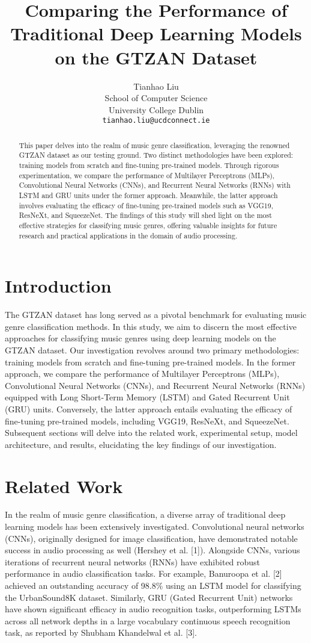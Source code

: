 \documentclass{article}
\title{Comparing the Performance of Traditional Deep Learning Models on the GTZAN Dataset}
\author{%
  Tianhao Liu \\
  School of Computer Science\\
  University College Dublin\\
  \texttt{tianhao.liu@ucdconnect.ie} \\
}
\begin{document}
\maketitle

\begin{abstract}
  This paper delves into the realm of music genre classification, leveraging the renowned GTZAN dataset as our testing ground. 
  Two distinct methodologies have been explored: training models from scratch and fine-tuning pre-trained models. 
  Through rigorous experimentation, we compare the performance of Multilayer Perceptrons (MLPs), Convolutional Neural Networks (CNNs), and Recurrent Neural Networks (RNNs) with LSTM and GRU units under the former approach. 
  Meanwhile, the latter approach involves evaluating the efficacy of fine-tuning pre-trained models such as VGG19, ResNeXt, and SqueezeNet. 
  The findings of this study will shed light on the most effective strategies for classifying music genres, offering valuable insights for future research and practical applications in the domain of audio processing.
\end{abstract}

\section{Introduction}
The GTZAN dataset has long served as a pivotal benchmark for evaluating music genre classification methods. 
In this study, we aim to discern the most effective approaches for classifying music genres using deep learning models on the GTZAN dataset. Our investigation revolves around two primary methodologies: training models from scratch and fine-tuning pre-trained models. 
In the former approach, we compare the performance of Multilayer Perceptrons (MLPs), Convolutional Neural Networks (CNNs), and Recurrent Neural Networks (RNNs) equipped with Long Short-Term Memory (LSTM) and Gated Recurrent Unit (GRU) units. 
Conversely, the latter approach entails evaluating the efficacy of fine-tuning pre-trained models, including VGG19, ResNeXt, and SqueezeNet.
Subsequent sections will delve into the related work, experimental setup, model architecture, and results, elucidating the key findings of our investigation.


\section{Related Work}
In the realm of music genre classification, a diverse array of traditional deep learning models has been extensively investigated. Convolutional neural networks (CNNs), originally designed for image classification, have demonstrated notable success in audio processing as well (Hershey et al. [1]). 
Alongside CNNs, various iterations of recurrent neural networks (RNNs) have exhibited robust performance in audio classification tasks. For example, Banuroopa et al. [2] achieved an outstanding accuracy of 98.8\% using an LSTM model for classifying the UrbanSound8K dataset. 
Similarly, GRU (Gated Recurrent Unit) networks have shown significant efficacy in audio recognition tasks, outperforming LSTMs across all network depths in a large vocabulary continuous speech recognition task, as reported by Shubham Khandelwal et al. [3].
\end{document}
